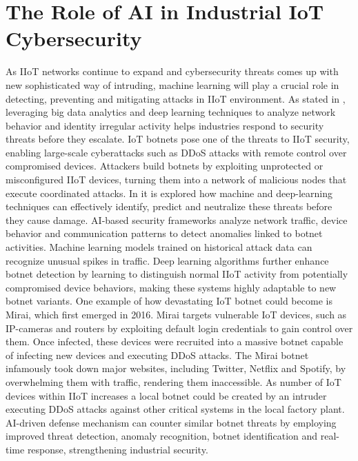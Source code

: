 \documentclass[article,a4paper]{IEEEtran}
\begin{document}
\section{The Role of AI in Industrial IoT Cybersecurity}
As IIoT networks continue to expand and cybersecurity threats comes up with new sophisticated way of intruding, machine learning will play a crucial role in detecting, preventing and mitigating attacks in IIoT environment. As stated in \cite{Deeplearning}, leveraging big data analytics and deep learning techniques to analyze network behavior and identity irregular activity helps industries respond to security threats before they escalate. 
\newline\newline
IoT botnets pose one of the threats to IIoT security, enabling large-scale cyberattacks such as DDoS attacks with remote control over compromised devices. Attackers build botnets by exploiting unprotected or misconfigured IIoT devices, turning them into a network of malicious nodes that execute coordinated attacks. In \cite{botnets} it is explored how machine and deep-learning techniques can effectively identify, predict and neutralize these threats before they cause damage. 
\newline\newline
AI-based security frameworks analyze network traffic, device behavior and communication patterns to detect anomalies linked to botnet activities. Machine learning models trained on historical attack data can recognize unusual spikes in traffic. Deep learning algorithms further enhance botnet detection by learning to distinguish normal IIoT activity from potentially compromised device behaviors, making these systems highly adaptable to new botnet variants. 
\newline\newline
One example \cite{Mirai} of how devastating IoT botnet could become is Mirai, which first emerged in 2016. Mirai targets vulnerable IoT devices, such as IP-cameras and routers by exploiting default login credentials to gain control over them. Once infected, these devices were recruited into a massive botnet capable of infecting new devices and executing DDoS attacks. The Mirai botnet infamously took down major websites, including Twitter, Netflix and Spotify, by overwhelming them with traffic, rendering them inaccessible. As number of IoT devices within IIoT increases a local botnet could be created by an intruder executing DDoS attacks against other critical systems in the local factory plant. 
\newline
AI-driven defense mechanism can counter similar botnet threats by employing improved threat detection, anomaly recognition, botnet identification and real-time response, strengthening industrial security. 
\end{document}
